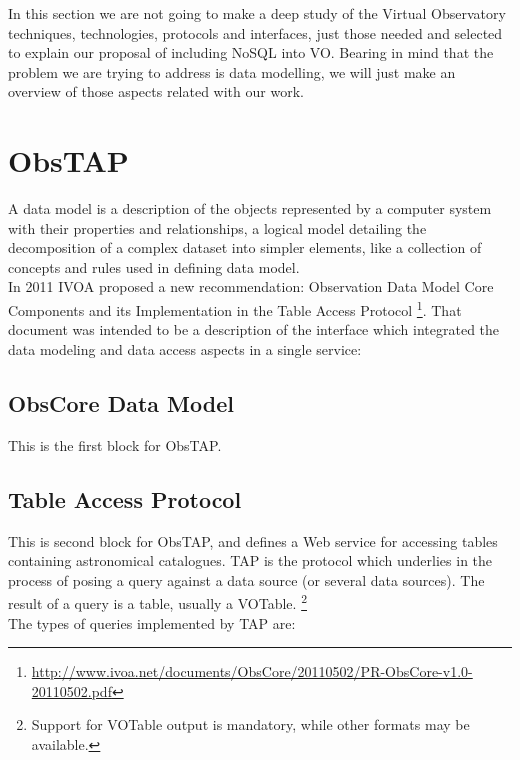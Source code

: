 In this section we are not going to make a deep study of the Virtual Observatory techniques, technologies, protocols and interfaces, just those needed and selected to explain our proposal of including NoSQL into VO. Bearing in mind that the problem we are trying to address is data modelling, we will just make an overview of those aspects related with our work.\\

\section{ObsTAP}

A data model is a description of the objects represented by a computer system with their properties and relationships, a logical model detailing the decomposition of a complex dataset into simpler elements, like a collection of concepts and rules used in defining data model.\\

In 2011 IVOA proposed a new recommendation: Observation Data Model Core Components and its Implementation in the Table Access Protocol \footnote{\url{http://www.ivoa.net/documents/ObsCore/20110502/PR-ObsCore-v1.0-20110502.pdf}}. That document was intended to be a description of the interface which integrated the data modeling and data access aspects in a single service:\\ 


\subsection{ObsCore Data Model}

This is the first block for ObsTAP.

\subsection{Table Access Protocol}

This is second block for ObsTAP, and defines a Web service for accessing tables containing astronomical catalogues. TAP is the protocol which underlies in the process of posing a query against a data source (or several data sources). The result of a query is a table, usually a VOTable. \footnote{Support for VOTable output is mandatory, while other formats may be available.}\\

The types of queries implemented by TAP are:

